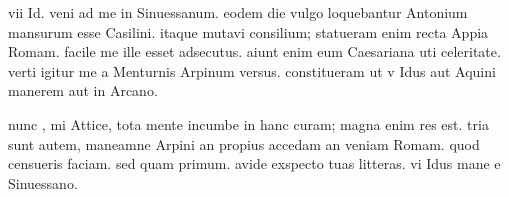 


 vii Id. veni ad me in Sinuessanum. eodem die vulgo loquebantur Antonium mansurum esse Casilini. itaque mutavi consilium; statueram enim recta Appia Romam. facile me ille esset adsecutus. aiunt enim eum Caesariana uti celeritate. verti igitur me a Menturnis Arpinum versus. constitueram ut v Idus aut Aquini manerem aut in Arcano.

 nunc , mi Attice, tota mente incumbe in hanc curam; magna enim res est. tria sunt autem, maneamne Arpini an propius accedam an veniam Romam. quod censueris faciam. sed quam primum. avide exspecto tuas litteras. vi Idus mane e Sinuessano.
